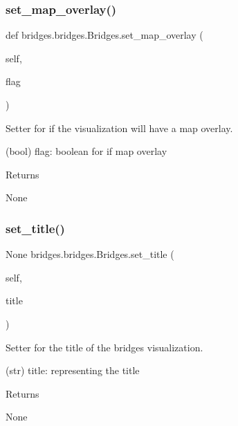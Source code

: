 \subsubsection{\texorpdfstring{set\_map\_overlay()}{set\_map\_overlay()}}
{\footnotesize\ttfamily def bridges.\+bridges.\+Bridges.\+set\+\_\+map\+\_\+overlay (\begin{DoxyParamCaption}\item[{}]{self,  }\item[{}]{flag }\end{DoxyParamCaption})}



Setter for if the visualization will have a map overlay. 

\begin{DoxyVerb}       (bool) flag: boolean for if map overlay
\end{DoxyVerb}
 \begin{DoxyReturn}{Returns}


None 
\end{DoxyReturn}
\mbox{\label{classbridges_1_1bridges_1_1_bridges_a46ecfa60298f97bd7605f1e224cfab10}} 
\subsubsection{\texorpdfstring{set\_title()}{set\_title()}}
{\footnotesize\ttfamily  None bridges.\+bridges.\+Bridges.\+set\+\_\+title (\begin{DoxyParamCaption}\item[{}]{self,  }\item[{}]{title }\end{DoxyParamCaption})}



Setter for the title of the bridges visualization. 

\begin{DoxyVerb}       (str) title: representing the title
\end{DoxyVerb}
 \begin{DoxyReturn}{Returns}


None 
\end{DoxyReturn}
\mbox{\label{classbridges_1_1bridges_1_1_bridges_a3f97735d336faf40585e99362d64a3ee}} 
